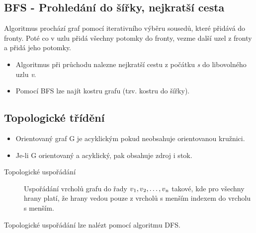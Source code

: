   \subsection{BFS - Prohledání do šířky, nejkratší cesta}
    Algoritmus prochází graf pomocí iterativního výběru sousedů, které přidává do fronty. Poté co v uzlu přidá všechny potomky do fronty, vezme další uzel z fronty a přidá jeho potomky.

    \begin{itemize}
      \item Algoritmus při průchodu nalezne nejkratší cestu z počátku \emph{s} do libovolného uzlu \emph{v}.
      \item Pomocí BFS lze najít kostru grafu (tzv. kostru do šířky).
    \end{itemize}

  \subsection{Topologické třídění}
    \begin{itemize}
      \item Orientovaný graf G je acyklickým pokud neobsahuje orientovanou kružnici.
      \item Je-li G orientovaný a acyklický, pak obsahuje zdroj i stok.
    \end{itemize}

    \begin{description}
      \item[Topologické uspořádání] Uspořádání vrcholů grafu do řady $v\textsubscript{1}, v\textsubscript{2}, \dots, v\textsubscript{n}$ takové, kde pro všechny hrany platí, že hrany vedou pouze z vrcholů s menším indexem do vrcholu s menším.
    \end{description}

    Topologické uspořádání lze nalézt pomocí algoritmu DFS.
